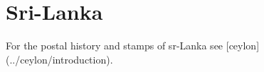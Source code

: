 
\section{Sri-Lanka}

For the postal history and stamps of sr-Lanka see [ceylon](../ceylon/introduction).
